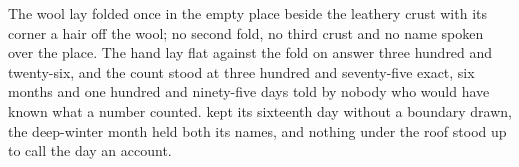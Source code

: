 The wool lay folded once in the empty place beside the leathery crust with its corner a hair off the wool; no second fold, no third crust and no name spoken over the place. The hand lay flat against the fold on answer three hundred and twenty-six, and the count stood at three hundred and seventy-five exact, six months and one hundred and ninety-five days told by nobody who would have known what a number counted.  kept its sixteenth day without a boundary drawn, the deep-winter month held both its names, and nothing under the roof stood up to call the day an account.
